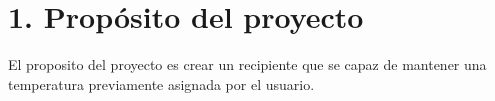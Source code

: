\section{1. Propósito del proyecto}
\label{sec:proposito}

\quad El proposito del proyecto es crear un recipiente que se capaz de mantener una temperatura previamente asignada por el usuario.